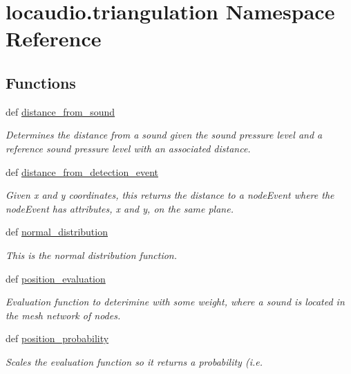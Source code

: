 \hypertarget{namespacelocaudio_1_1triangulation}{\section{locaudio.\-triangulation Namespace Reference}
\label{namespacelocaudio_1_1triangulation}
}
\subsection*{Functions}
\begin{DoxyCompactItemize}
\item 
def \hyperlink{namespacelocaudio_1_1triangulation_aa6072b3aad637ae71a38424f23014a86}{distance\-\_\-from\-\_\-sound}
\begin{DoxyCompactList}\small\item\em Determines the distance from a sound given the sound pressure level and a reference sound pressure level with an associated distance. \end{DoxyCompactList}\item 
def \hyperlink{namespacelocaudio_1_1triangulation_a1206790ce9fd39f59ce264ac7c7fb443}{distance\-\_\-from\-\_\-detection\-\_\-event}
\begin{DoxyCompactList}\small\item\em Given x and y coordinates, this returns the distance to a node\-Event where the node\-Event has attributes, x and y, on the same plane. \end{DoxyCompactList}\item 
def \hyperlink{namespacelocaudio_1_1triangulation_aa221cba0226b13aff028ca9155dfbd76}{normal\-\_\-distribution}
\begin{DoxyCompactList}\small\item\em This is the normal distribution function. \end{DoxyCompactList}\item 
def \hyperlink{namespacelocaudio_1_1triangulation_acf50f5be4536fb0929c359396d41828f}{position\-\_\-evaluation}
\begin{DoxyCompactList}\small\item\em Evaluation function to deterimine with some weight, where a sound is located in the mesh network of nodes. \end{DoxyCompactList}\item 
def \hyperlink{namespacelocaudio_1_1triangulation_ab85ddfec0f2c6c1c20134d90a6fe874a}{position\-\_\-probability}
\begin{DoxyCompactList}\small\item\em Scales the evaluation function so it returns a probability (i.\-e. \end{DoxyCompactList}\item 

\end{DoxyCompactItemize}

